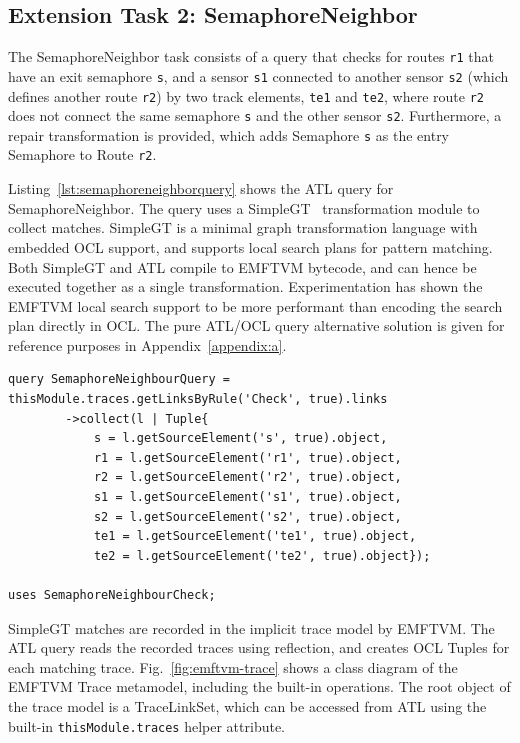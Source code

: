 \documentclass[submission,copyright,creativecommons]{eptcs}
\begin{document}
\subsection{Extension Task 2: SemaphoreNeighbor}

The SemaphoreNeighbor task consists of a query that checks for routes \texttt{r1} that have an exit semaphore \texttt{s}, and a sensor \texttt{s1} connected to another sensor \texttt{s2} (which defines another route \texttt{r2}) by two track elements, \texttt{te1} and \texttt{te2}, where route \texttt{r2} does not connect the same semaphore \texttt{s} and the other sensor \texttt{s2}. Furthermore, a repair transformation is provided, which adds Semaphore \texttt{s} as the entry Semaphore to Route \texttt{r2}.

Listing~\ref{lst:semaphoreneighborquery} shows the ATL query for SemaphoreNeighbor. The query uses a SimpleGT~\cite{conf/models/Wagelaar2011} transformation module to collect matches. SimpleGT is a minimal graph transformation language with embedded OCL support, and supports local search plans for pattern matching. Both SimpleGT and ATL compile to EMFTVM bytecode, and can hence be executed together as a single transformation. Experimentation has shown the EMFTVM local search support to be more performant than encoding the search plan directly in OCL. The pure ATL/OCL query alternative solution is given for reference purposes in Appendix~\ref{appendix:a}.

\lstset{language=atl}
\begin{lstlisting}[float=htb, caption={SemaphoreNeighborQuery in ATL}, label=lst:semaphoreneighborquery, captionpos=b, frame=tb, belowskip=-10pt]
query SemaphoreNeighbourQuery = thisModule.traces.getLinksByRule('Check', true).links
		->collect(l | Tuple{
			s = l.getSourceElement('s', true).object,
			r1 = l.getSourceElement('r1', true).object,
			r2 = l.getSourceElement('r2', true).object,
			s1 = l.getSourceElement('s1', true).object,
			s2 = l.getSourceElement('s2', true).object,
			te1 = l.getSourceElement('te1', true).object,
			te2 = l.getSourceElement('te2', true).object});

uses SemaphoreNeighbourCheck;
\end{lstlisting}

SimpleGT matches are recorded in the implicit trace model by EMFTVM. The ATL query reads the recorded traces using reflection, and creates OCL Tuples for each matching trace. Fig.~\ref{fig:emftvm-trace} shows a class diagram of the EMFTVM Trace metamodel, including the built-in operations. The root object of the trace model is a TraceLinkSet, which can be accessed from ATL using the built-in \texttt{thisModule.traces} helper attribute.
\end{document}
